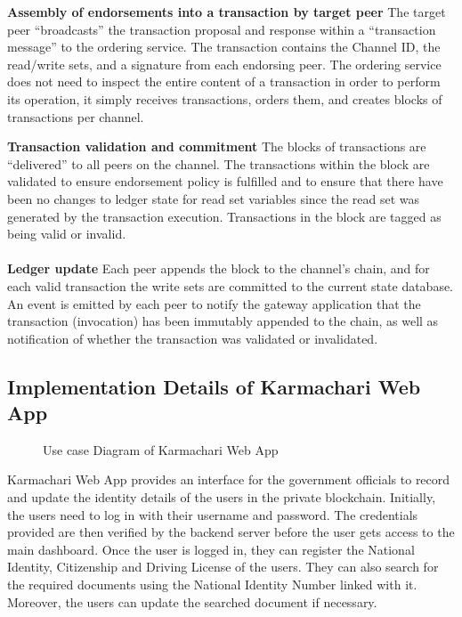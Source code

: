 \textbf{Assembly of endorsements into a transaction by target peer} \newline
The target peer “broadcasts” the transaction proposal and response within a “transaction message” to the ordering service. The transaction contains the Channel ID, the read/write sets, and a signature from each endorsing peer. The ordering service does not need to inspect the entire content of a transaction in order to perform its operation, it simply receives transactions, orders them, and creates blocks of transactions per channel.

\textbf{Transaction validation and commitment} \newline
The blocks of transactions are “delivered” to all peers on the channel. The transactions within the block are validated to ensure endorsement policy is fulfilled and to ensure that there have been no changes to ledger state for read set variables since the read set was generated by the transaction execution. Transactions in the block are tagged as being valid or invalid.\\\\

\textbf{Ledger update} \newline
Each peer appends the block to the channel’s chain, and for each valid transaction the write sets are committed to the current state database. An event is emitted by each peer to notify the gateway application that the transaction (invocation) has been immutably appended to the chain, as well as notification of whether the transaction was validated or invalidated.




\subsection{Implementation Details of Karmachari Web App}
\vspace{15pt}
    \begin{figure}[H]
\centerline{}
\caption{Use case Diagram of Karmachari Web App}

\label{fig: KarmachariUsecase.svg}
\end{figure}


Karmachari Web App provides an interface for the government officials to record and update the identity details of the users in the private blockchain. Initially, the users need to log in with their username and password. The credentials provided are then verified by the backend server before the user gets access to the main dashboard. Once the user is logged in, they can register the National Identity, Citizenship and Driving License of the users. They can also search for the required documents using the National Identity Number linked with it. Moreover, the users can update the searched document if necessary. \\\\
    

